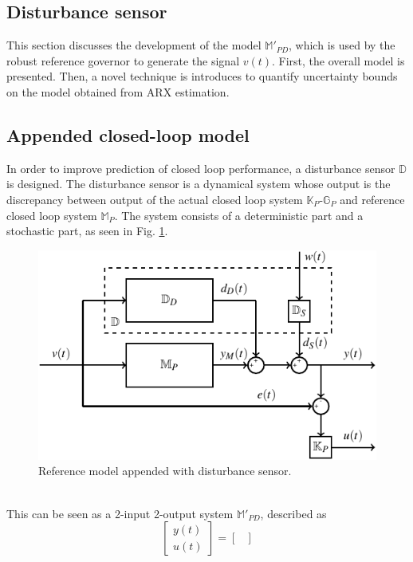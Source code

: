 \documentclass[letterpaper, 10 pt, conference]{ieeeconf}  %
\begin{document}
\begin{enumerate}
	\section{Disturbance sensor}
	\label{Contribution}
	This section discusses the development of the model $\mathbb{M}'_{PD}$, which is used by the robust reference governor to generate the signal $v(t)$. First, the overall model is presented. Then, a novel technique is introduces to quantify uncertainty bounds on the model obtained from ARX estimation.
	\subsection{Appended closed-loop model}
	In order to improve prediction of closed loop performance, a disturbance sensor $\mathbb{D}$ is designed. The disturbance sensor is a dynamical system whose output is the discrepancy between output of the actual closed loop system  $\mathbb{K}_P$-$\mathbb{G}_P$ and reference closed loop system $\mathbb{M}_P$. The system consists of a deterministic part and a stochastic part, as seen in Fig. \ref{Appended}.
	\begin{figure}[h]
		\hspace{30pt}
		\includegraphics[scale = 0.7]{Mp-D-E.pdf}
		\caption{Reference model appended with disturbance sensor.}
		\label{Appended}
	\end{figure}
	\\
	This can be seen as a 2-input 2-output system $\mathbb{M}'_{PD}$, described as
	\begin{equation}
	\begin{bmatrix}
		y(t) \\ u(t)
	 \end{bmatrix} = 
	 \begin{bmatrix} 

\end{bmatrix}
\end{equation}
\end{enumerate}
\end{document}
